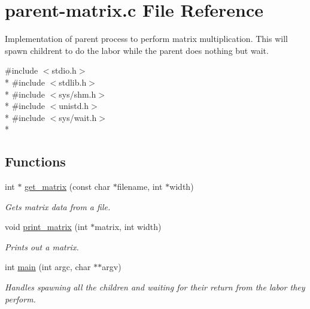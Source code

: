 \hypertarget{parent-matrix_8c}{\section{parent-\/matrix.c File Reference}
\label{parent-matrix_8c}
}


Implementation of parent process to perform matrix multiplication. This will spawn childrent to do the labor while the parent does nothing but wait.  


{\ttfamily \#include $<$stdio.\-h$>$}\\*
{\ttfamily \#include $<$stdlib.\-h$>$}\\*
{\ttfamily \#include $<$sys/shm.\-h$>$}\\*
{\ttfamily \#include $<$unistd.\-h$>$}\\*
{\ttfamily \#include $<$sys/wait.\-h$>$}\\*
\subsection*{Functions}
\begin{DoxyCompactItemize}
\item 
int $\ast$ \hyperlink{parent-matrix_8c_a2dcbc9f37a8a160f754c9799f5e505bd}{get\-\_\-matrix} (const char $\ast$filename, int $\ast$width)
\begin{DoxyCompactList}\small\item\em Gets matrix data from a file. \end{DoxyCompactList}\item 
void \hyperlink{parent-matrix_8c_a62514f596204ff609ea148da4b58293a}{print\-\_\-matrix} (int $\ast$matrix, int width)
\begin{DoxyCompactList}\small\item\em Prints out a matrix. \end{DoxyCompactList}\item 
int \hyperlink{parent-matrix_8c_a3c04138a5bfe5d72780bb7e82a18e627}{main} (int argc, char $\ast$$\ast$argv)
\begin{DoxyCompactList}\small\item\em Handles spawning all the children and waiting for their return from the labor they perform. \end{DoxyCompactList}\end{DoxyCompactItemize}


